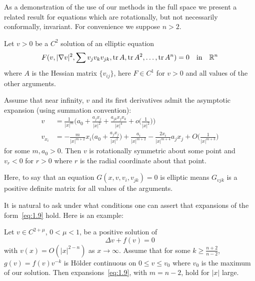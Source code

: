 As a demonstration of the use of our methods in the full space we present a related result for 
equations which are rotationally, but not necessarily conformally, invariant.
For convenience we suppose $n>2$.

\begin{theorem}\label{thm:4}
  Let $v>0$ be a $C^2$ solution of an elliptic equation
  \begin{equation}\label{eq:1.8}
    F(v, |\nabla v|^2, \sum v_jv_kv_{jk}, \operatorname{tr} A, \operatorname{tr} A^2, \ldots, \operatorname{tr} A^n) = 0
    \quad\text{in}\quad \mathbb{R}^n
  \end{equation}
  where $A$ is the Hessian matrix $\{v_{ij}\}$, here $F\in C^1$ for $v>0$
  and all values of the other arguments.

  Assume that near infinity, $v$ and its first derivatives admit the asymptotic
  expansion (using summation convention):
  \begin{equation}\label{eq:1.9}
    \begin{aligned}
      v & = \frac{1}{|x|^m}\biggl(a_0 + \frac{a_jx_j}{|x|^2} + \frac{a_{jk}x_jx_k}{|x|^4}
            + o\biggl(\frac{1}{|x|^2}\biggr)\biggr) \\
      v_{x_i} & = -\frac{m}{|x|^{m+2}} x_i\biggl(a_0 + \frac{a_jx_j}{|x|^2}\biggr)
            + \frac{a_i}{|x|^{m+2}} - \frac{2x_i}{|x|^{m+4}}a_jx_j
            + O\biggl(\frac{1}{|x|^{m+3}}\biggr)
    \end{aligned}
  \end{equation}
  for some $m, a_0> 0$. Then $v$ is rotationally symmetric about some point and $v_r<0$ 
  for $r > 0$ where $r$ is the radial coordinate about that point.
\end{theorem}

Here, to say that an equation $G(x, v, v_i, v_{jk})= 0$ is elliptic means 
$G_{vjk}$ is a positive definite matrix for all values of the arguments.

It is natural to ask under what conditions one can assert that expansions of the 
form~\eqref{eq:1.9} hold. Here is an example:
\begin{proposition}
  Let $v\in C^{2+\mu}$, $0<\mu<1$, be a positive solution of
  \begin{equation}\label{eq:1.8prime}
    \Delta v + f(v) = 0 \tag{$1.8'$}
  \end{equation}
  with $v(x) = O(|x|^{2-n})$ as $x\to\infty$. Assume that for some
  $k\geq\frac{n+2}{n-2}$, $g(v) = f(v)v^{-k}$ is H\"older continuous on $0\leq v\leq v_0$
  where $v_0$ is the maximum of our solution. Then expansions~\eqref{eq:1.9},
  with $m=n-2$, hold for $|x|$ large.
\end{proposition}

